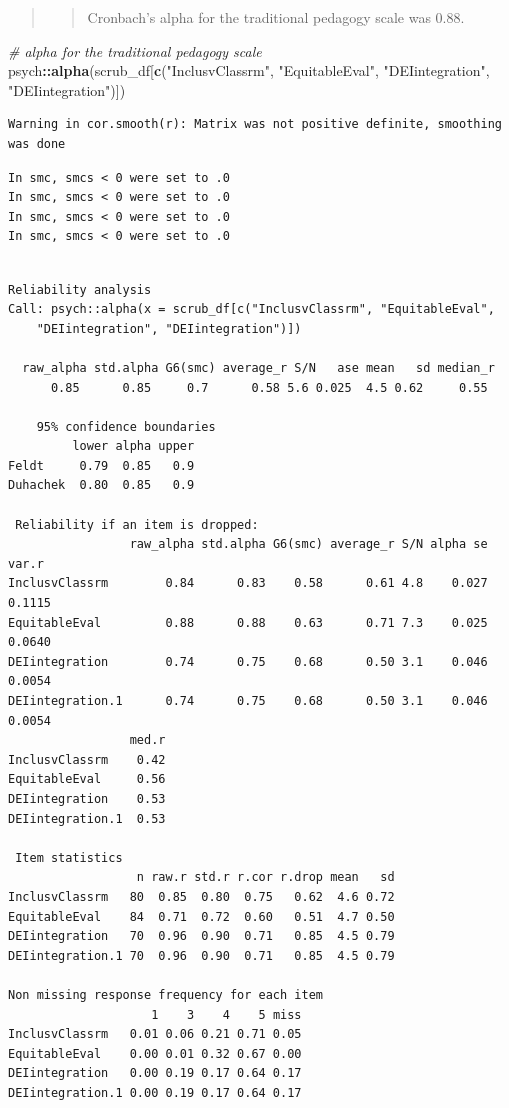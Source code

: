 \documentclass[
  11pt,
]{book}
\newenvironment{Shaded}{\begin{snugshade}}{\end{snugshade}}
\newcommand{\CommentTok}[1]{\textcolor[rgb]{0.37,0.37,0.37}{\textit{#1}}}
\newcommand{\FunctionTok}[1]{\textcolor[rgb]{0.27,0.27,0.27}{\textbf{#1}}}
\newcommand{\NormalTok}[1]{#1}
\newcommand{\SpecialCharTok}[1]{\textcolor[rgb]{0.43,0.43,0.43}{\textbf{#1}}}
\newcommand{\StringTok}[1]{\textcolor[rgb]{0.5,0.5,0.5}{#1}}
\begin{document}
\begin{quote}
\begin{quote}
Cronbach's alpha for the traditional pedagogy scale was 0.88.
\end{quote}
\end{quote}

\begin{Shaded}
\begin{Highlighting}[]
\CommentTok{\# alpha for the traditional pedagogy scale}
\NormalTok{psych}\SpecialCharTok{::}\FunctionTok{alpha}\NormalTok{(scrub\_df[}\FunctionTok{c}\NormalTok{(}\StringTok{"InclusvClassrm"}\NormalTok{, }\StringTok{"EquitableEval"}\NormalTok{, }\StringTok{"DEIintegration"}\NormalTok{,}
    \StringTok{"DEIintegration"}\NormalTok{)])}
\end{Highlighting}
\end{Shaded}

\begin{verbatim}
Warning in cor.smooth(r): Matrix was not positive definite, smoothing was done
\end{verbatim}

\begin{verbatim}
In smc, smcs < 0 were set to .0
In smc, smcs < 0 were set to .0
In smc, smcs < 0 were set to .0
In smc, smcs < 0 were set to .0
\end{verbatim}

\begin{verbatim}

Reliability analysis   
Call: psych::alpha(x = scrub_df[c("InclusvClassrm", "EquitableEval", 
    "DEIintegration", "DEIintegration")])

  raw_alpha std.alpha G6(smc) average_r S/N   ase mean   sd median_r
      0.85      0.85     0.7      0.58 5.6 0.025  4.5 0.62     0.55

    95% confidence boundaries 
         lower alpha upper
Feldt     0.79  0.85   0.9
Duhachek  0.80  0.85   0.9

 Reliability if an item is dropped:
                 raw_alpha std.alpha G6(smc) average_r S/N alpha se  var.r
InclusvClassrm        0.84      0.83    0.58      0.61 4.8    0.027 0.1115
EquitableEval         0.88      0.88    0.63      0.71 7.3    0.025 0.0640
DEIintegration        0.74      0.75    0.68      0.50 3.1    0.046 0.0054
DEIintegration.1      0.74      0.75    0.68      0.50 3.1    0.046 0.0054
                 med.r
InclusvClassrm    0.42
EquitableEval     0.56
DEIintegration    0.53
DEIintegration.1  0.53

 Item statistics 
                  n raw.r std.r r.cor r.drop mean   sd
InclusvClassrm   80  0.85  0.80  0.75   0.62  4.6 0.72
EquitableEval    84  0.71  0.72  0.60   0.51  4.7 0.50
DEIintegration   70  0.96  0.90  0.71   0.85  4.5 0.79
DEIintegration.1 70  0.96  0.90  0.71   0.85  4.5 0.79

Non missing response frequency for each item
                    1    3    4    5 miss
InclusvClassrm   0.01 0.06 0.21 0.71 0.05
EquitableEval    0.00 0.01 0.32 0.67 0.00
DEIintegration   0.00 0.19 0.17 0.64 0.17
DEIintegration.1 0.00 0.19 0.17 0.64 0.17
\end{verbatim}
\end{document}
